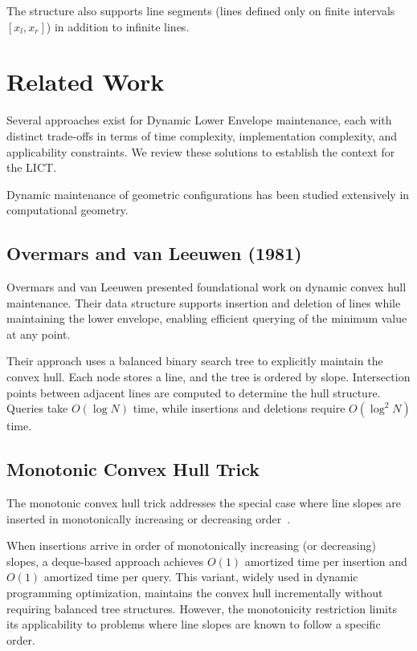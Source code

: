 \documentclass[11pt,a4paper]{article}
\theoremstyle{definition}
\theoremstyle{plain}
\begin{document}
The structure also supports line segments (lines defined only on finite intervals $[x_l, x_r]$) in addition to infinite lines.

\section{Related Work}\label{sec:related}

Several approaches exist for Dynamic Lower Envelope maintenance, each with distinct trade-offs in terms of time complexity, implementation complexity, and applicability constraints. We review these solutions to establish the context for the LICT.

Dynamic maintenance of geometric configurations has been studied extensively in computational geometry.

\subsection{Overmars and van Leeuwen (1981)}

Overmars and van Leeuwen \cite{overmars1981} presented foundational work on dynamic convex hull maintenance. Their data structure supports insertion and deletion of lines while maintaining the lower envelope, enabling efficient querying of the minimum value at any point.

Their approach uses a balanced binary search tree to explicitly maintain the convex hull. Each node stores a line, and the tree is ordered by slope. Intersection points between adjacent lines are computed to determine the hull structure. Queries take $O(\log N)$ time, while insertions and deletions require $O(\log^2 N)$ time.

\subsection{Monotonic Convex Hull Trick}

The monotonic convex hull trick addresses the special case where line slopes are inserted in monotonically increasing or decreasing order~\cite{cpalgorithms_cht}.

When insertions arrive in order of monotonically increasing (or decreasing) slopes, a deque-based approach achieves $O(1)$ amortized time per insertion and $O(1)$ amortized time per query. This variant, widely used in dynamic programming optimization, maintains the convex hull incrementally without requiring balanced tree structures. However, the monotonicity restriction limits its applicability to problems where line slopes are known to follow a specific order.
\end{document}
